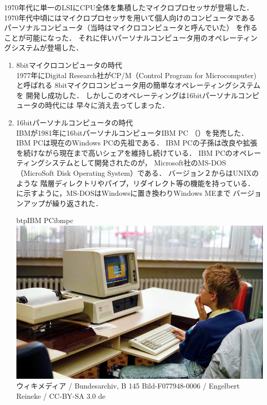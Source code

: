 1970年代に単一のLSIにCPU全体を集積したマイクロプロセッサが登場した．
1970年代中頃にはマイクロプロセッサを用いて個人向けのコンピュータである
パーソナルコンピュータ（当時はマイクロコンピュータと呼んでいた）
を作ることが可能になった．
それに伴いパーソナルコンピュータ用のオペレーティングシステムが登場した．

\begin{enumerate}
\item 8bitマイクロコンピュータの時代 \\
  1977年にDigital Research社がCP/M（Control Program for Microcomputer)と呼ばれる
    8bitマイクロコンピュータ用の簡単なオペレーティングシステムを
    開発し成功した．
    しかしこのオペレーティングは16bitパーソナルコンピュータの時代には
    早々に消え去ってしまった\cite{fourth}．

  \item 16bitパーソナルコンピュータの時代 \\
    IBMが1981年に16bitパーソナルコンピュータIBM PC\cite{ibmpc81}
    （）を発売した．
    IBM PCは現在のWindows PCの先祖である．
    IBM PCの子孫は改良や拡張を続けながら現在まで高いシェアを維持し続けている．
    IBM PCのオペレーティングシステムとして開発されたのが，
    Microsoft社のMS-DOS（MicroSoft Disk Operating System）\cite{msdos}である．
    バージョン２からはUNIXのような
    階層ディレクトリやパイプ，リダイレクト等の機能を持っている．
    に示すように，MS-DOSはWindowsに置き換わりWindows MEまで
    バージョンアップが繰り返された．

    \begin{myfig}{btp}{IBM PC}{ibmpc}
      \includegraphics[scale=0.35]
                      {Photo/Bundesarchiv_B_145_Bild-F077948-0006,_Jugend-Computerschule_mit_IBM-PC.jpg}\\
                      {\small
                        ウィキメディア /
                        Bundesarchiv, B 145 Bild-F077948-0006 /
                        Engelbert Reineke / CC-BY-SA 3.0 de}
    \end{myfig}


\end{enumerate}
